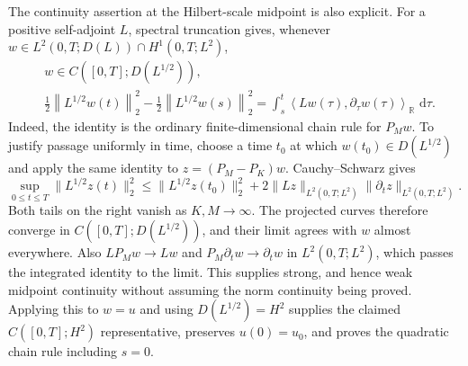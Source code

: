 \documentclass[11pt]{article}
\numberwithin{equation}{section}
\theoremstyle{definition}
\newcommand{\R}{\mathbb R}
\newcommand{\dd}{\,\mathrm d}
\newcommand{\norm}[1]{\left\lVert#1\right\rVert}
\newcommand{\ip}[2]{\left\langle #1,#2\right\rangle}
\begin{document}
The continuity assertion at the Hilbert-scale midpoint is also explicit.
For a positive self-adjoint $L$, spectral truncation gives, whenever
$w\in L^2(0,T;D(L))\cap H^1(0,T;L^2)$,
\begin{equation}
 \begin{aligned}
  &w\in C([0,T];D(L^{1/2})),\\
  &\frac12\norm{L^{1/2}w(t)}_2^2-
   \frac12\norm{L^{1/2}w(s)}_2^2
   =\int_s^t\ip{Lw(\tau)}{\partial_\tau w(\tau)}_{\R}\,\dd\tau .
 \end{aligned}
 \label{eq:hilbert-scale-chain}
\end{equation}
Indeed, the identity is the ordinary finite-dimensional chain rule for
$P_Mw$.  To justify passage uniformly in time, choose a time $t_0$ at which
$w(t_0)\in D(L^{1/2})$ and apply the same identity to
$z=(P_M-P_K)w$.  Cauchy--Schwarz gives
\begin{equation}
 \sup_{0\le t\le T}\|L^{1/2}z(t)\|_2^2
 \le \|L^{1/2}z(t_0)\|_2^2
      +2\|Lz\|_{L^2(0,T;L^2)}\|\partial_tz\|_{L^2(0,T;L^2)}.
 \label{eq:midpoint-uniform-tail}
\end{equation}
Both tails on the right vanish as $K,M\to\infty$.  The projected curves
therefore converge in $C([0,T];D(L^{1/2}))$, and their limit agrees with
$w$ almost everywhere.  Also $LP_Mw\to Lw$ and
$P_M\partial_tw\to\partial_tw$ in $L^2(0,T;L^2)$, which passes the
integrated identity to the limit.  This supplies strong, and hence weak
midpoint continuity without assuming the norm continuity being proved.
Applying this to $w=u$ and using
$D(L^{1/2})=H^2$ supplies the claimed $C([0,T];H^2)$ representative, preserves
$u(0)=u_0$, and proves the quadratic chain rule including $s=0$.
\end{document}
